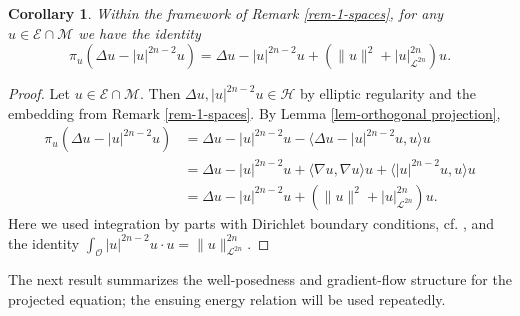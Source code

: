 \documentclass[10pt,a4paper]{amsart}
\numberwithin{equation}{section}
\newtheorem{corollary}[theorem]{Corollary}
\begin{document}
\begin{corollary}
\label{cor-projection}
Within the framework of Remark \ref{rem-1-spaces}, for any
$u \in \mathcal{E} \cap \mathcal{M}$ we have the identity
\begin{equation}
\pi_{u} \left( \Delta u - |u|^{2n-2} u \right)
= \Delta u - |u|^{2n-2} u + \left( \|u\|^{2} + |u|_{\mathcal{L}^{2n}}^{2n} \right) u.
\label{1-1.2}
\end{equation}
\end{corollary}

\begin{proof}
Let $u \in \mathcal{E} \cap \mathcal{M}$. Then $\Delta u, |u|^{2n-2}u \in \mathcal{H}$
by elliptic regularity and the embedding from Remark \ref{rem-1-spaces}.
By Lemma \ref{lem-orthogonal projection},
\begin{equation} \label{1-1.3}
\begin{aligned}
\pi_{u} \left( \Delta u - |u|^{2n-2} u \right)
&= \Delta u - |u|^{2n-2} u - \langle \Delta u - |u|^{2n-2} u, u \rangle u  \\
&= \Delta u - |u|^{2n-2} u + \langle \nabla u, \nabla u \rangle u
 + \langle |u|^{2n-2} u, u \rangle u  \\
&= \Delta u - |u|^{2n-2} u + \left( \|u\|^{2} + |u|_{\mathcal{L}^{2n}}^{2n} \right) u.
\end{aligned}
\end{equation}
Here we used integration by parts with Dirichlet boundary conditions,
cf. \cite[Corollary 8.10, p.~82]{Haim}, and the identity
$\int_{\mathcal{O}} |u|^{2n-2} u \cdot u = \|u\|_{\mathcal{L}^{2n}}^{2n}$.
\end{proof}

The next result summarizes the well-posedness and gradient-flow structure for the
projected equation; the ensuing energy relation will be used repeatedly.
\end{document}
